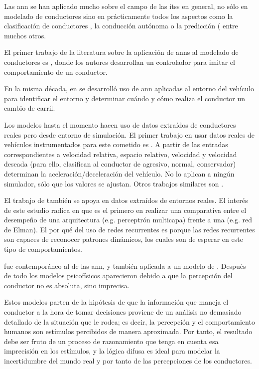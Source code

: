 Las \gls{ann} se han aplicado mucho sobre el campo de las \glspl{its} en general, no sólo en modelado de conductores sino en prácticamente todos los aspectos como la clasificación de conductores \cite{DiazAlvarez2014}, la conducción autónoma \cite{huval2015empirical} o la predicción (\cite{Dougherty1993, chan2012neural} entre muchos otros.

El primer trabajo de la literatura sobre la aplicación de \glspl{ann} al modelado de conductores es \cite{Fix1990}, donde los autores desarrollan un controlador para imitar el comportamiento de un conductor.

En la misma década, en \cite{Hunt1994} se desarrolló uso de \gls{ann} aplicadas al entorno del vehículo para identificar el entorno y determinar cuándo y cómo realiza el conductor un cambio de carril.

Los modelos hasta el momento hacen uso de datos extraídos de conductores reales pero desde entorno de simulación. El primer trabajo en usar datos reales de vehículos instrumentados para este cometido es \cite{Jia2003}. A partir de las entradas correspondientes a velocidad relativa, espacio relativo, velocidad y velocidad deseada (para ello, clasifican al conductor de agresivo, normal, conservador) determinan la aceleración/deceleración del vehículo. No lo aplican a ningún simulador, sólo que los valores se ajustan. Otros trabajos similares son \cite{Panwai2007, Khodayari2012}.

El trabajo de \cite{Simonelli2009} también se apoya en datos extraídos de entornos reales. El interés de este estudio radica en que es el primero en realizar una comparativa entre el desempeño de una arquitectura \textit{} (e.g. perceptrón multicapa) frente a una  (e.g. red de Elman). El por qué del uso de redes recurrentes es porque las redes recurrentes son capaces de reconocer patrones dinámicos, los cuales son de esperar en este tipo de comportamientos.

 fue contemporáneo al de las \gls{ann}, y también aplicada a un modelo de \textit{}. Después de todo los modelos psicofísicos aparecieron debido a que la percepción del conductor no es absoluta, sino imprecisa.

Estos modelos parten de la hipótesis de que la información que maneja el conductor a la hora de tomar decisiones proviene de un análisis no demasiado detallado de la situación que le rodea; es decir, la percepción y el comportamiento humanos son estímulos percibidos de manera aproximada. Por tanto, el resultado debe ser fruto de un proceso de razonamiento que tenga en cuenta esa imprecisión en los estímulos, y la lógica difusa es ideal para modelar la incertidumbre del mundo real y por tanto de las percepciones de los conductores.

